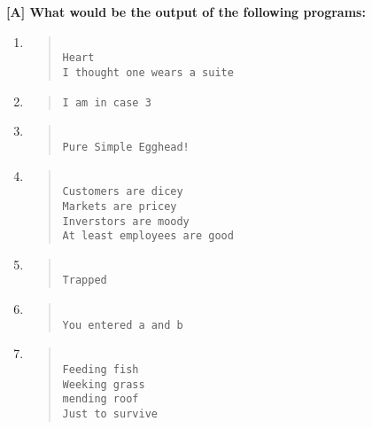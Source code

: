 \documentclass{report}
\begin{document}
\textbf{[A] What would be the output of the following programs:}
\begin{enumerate}
    \renewcommand{\labelenumi}{\alph{enumi}}
  \item \begin{quote} \begin{verbatim} 

Heart
I thought one wears a suite
  \end{verbatim} \end{quote}

  \item \begin{quote} \begin{verbatim} 
I am in case 3
  \end{verbatim} \end{quote}

  \item \begin{quote} \begin{verbatim} 

Pure Simple Egghead!
  \end{verbatim} \end{quote}

  \item \begin{quote} \begin{verbatim} 

Customers are dicey
Markets are pricey
Inverstors are moody
At least employees are good
  \end{verbatim} \end{quote}

  \item \begin{quote} \begin{verbatim} 

Trapped
  \end{verbatim} \end{quote}

  \item \begin{quote} \begin{verbatim} 

You entered a and b
  \end{verbatim} \end{quote}

  \item \begin{quote} \begin{verbatim} 

Feeding fish
Weeking grass
mending roof
Just to survive
  \end{verbatim} \end{quote}
\end{enumerate}
\end{document}
